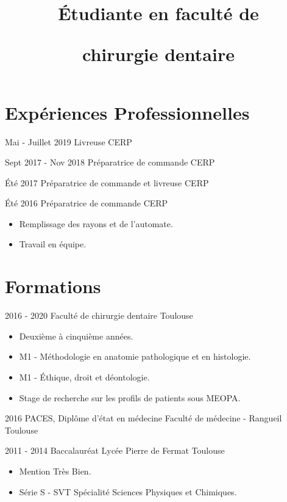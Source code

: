 \documentclass[11pt,a4paper]{moderncv}
\title{\centerline{Étudiante en faculté de}\newline\centerline{chirurgie dentaire}} %
\begin{document}
\maketitle

\section{Expériences Professionnelles}

\cventry
{Mai - Juillet 2019}
{Livreuse}
{CERP}
{}
{}
{}   %

\cventry
{Sept 2017 - Nov 2018}
{Préparatrice de commande}
{CERP}
{}
{}
{}   %

\cventry
{Été 2017}
{Préparatrice de commande et livreuse}
{CERP}
{}
{}
{}  %

\cventry
{Été 2016}
{Préparatrice de commande}
{CERP}
{}
{}
{\begin{itemize}
\item Remplissage des rayons et de l'automate.
\item Travail en équipe.
\end{itemize}
}   %


\section{Formations}
\cventry
{2016 - 2020}
{Faculté de chirurgie dentaire}
{}
{Toulouse}
{}
{\begin{itemize}
\item Deuxième à cinquième années.
\item M1 - Méthodologie en anatomie pathologique et en histologie.
\item M1 - Éthique, droit et déontologie.
\item Stage de recherche sur les profils de patients sous MEOPA.
\end{itemize}
}

\cventry
{2016}
{PACES, Diplôme d'état en médecine}
{Faculté de médecine - Rangueil}
{Toulouse}
{}
{}

\cventry
{2011 - 2014}
{Baccalauréat}
{Lycée Pierre de Fermat}
{Toulouse}
{}
{\begin{itemize}
\item Mention Très Bien.
\item Série S - SVT Spécialité Sciences Physiques et Chimiques.
\end{itemize}
}
\end{document}
